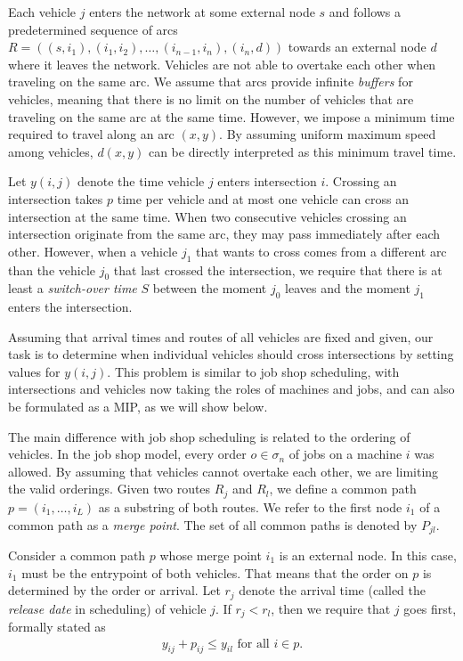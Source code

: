 \documentclass{article}
\theoremstyle{definition}
\begin{document}
Each vehicle $j$ enters the network at some external node $s$ and follows a
predetermined sequence of arcs
$R = ((s,i_{1}), (i_{1},i_{2}), \dots, (i_{n-1},i_{n}), (i_{n},d))$ towards an
external node $d$ where it leaves the network. Vehicles are not able to overtake
each other when traveling on the same arc. We assume that arcs provide
infinite \textit{buffers} for vehicles, meaning that there is no limit on the
number of vehicles that are traveling on the same arc at the same time.
However, we impose a minimum time required to travel along an arc $(x,y)$. By
assuming uniform maximum speed among vehicles, $d(x,y)$ can be directly
interpreted as this minimum travel time.

Let $y(i,j)$ denote the time vehicle $j$ enters intersection $i$. Crossing an
intersection takes $p$ time per vehicle and at most one vehicle can cross an
intersection at the same time. When two consecutive vehicles crossing an
intersection originate from the same arc, they may pass immediately after each
other. However, when a vehicle $j_{1}$ that wants to cross comes from a
different arc than the vehicle $j_{0}$ that last crossed the intersection, we
require that there is at least a \textit{switch-over time} $S$ between the
moment $j_{0}$ leaves and the moment $j_{1}$ enters the intersection.

Assuming that arrival times and routes of all vehicles are fixed and given, our
task is to determine when individual vehicles should cross intersections by
setting values for $y(i,j)$. This problem is similar to job shop scheduling,
with intersections and vehicles now taking the roles of machines and jobs, and
can also be formulated as a MIP, as we will show below.

The main difference with job shop scheduling is related to the ordering of
vehicles. In the job shop model, every order $o \in \sigma_{n}$ of jobs on a
machine $i$ was allowed. By assuming that vehicles cannot overtake each other,
we are limiting the valid orderings.
Given two routes $R_{j}$ and $R_{l}$, we define a common path
$p=(i_{1},\dots,i_{L})$ as a substring of both routes. We refer to the first
node $i_{1}$ of a common path as a \textit{merge point}. The set of all common
paths is denoted by $P_{jl}$.

Consider a common path $p$ whose merge point $i_{1}$ is an external node.
In this case, $i_{1}$ must be the entrypoint of both vehicles.
That means that the order on $p$ is determined by the order or arrival.
Let $r_{j}$ denote the arrival time (called the \textit{release date} in
scheduling) of vehicle $j$.
If $r_{j} < r_{l}$, then we require that $j$ goes first, formally stated as
\begin{align*}
  y_{ij} + p_{ij} \leq y_{il} \text{ for all } i \in p.
\end{align*}
\end{document}
